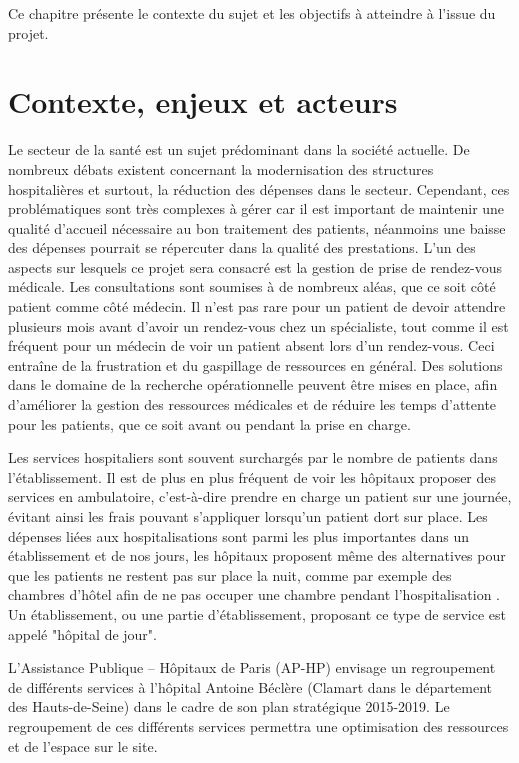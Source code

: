 \documentclass{polytech/polytech}
\begin{document}
Ce chapitre présente le contexte du sujet et les objectifs à atteindre à l'issue du projet.

\section{Contexte, enjeux et acteurs}


Le secteur de la santé est un sujet prédominant dans la société actuelle. De nombreux débats existent concernant la modernisation des structures hospitalières et surtout, la réduction des dépenses dans le secteur. Cependant, ces problématiques sont très complexes à gérer car il est important de maintenir une qualité d'accueil nécessaire au bon traitement des patients, néanmoins une baisse des dépenses pourrait se répercuter dans la qualité des prestations. L'un des aspects sur lesquels ce projet sera consacré est la gestion de prise de rendez-vous médicale. Les consultations sont soumises à de nombreux aléas, que ce soit côté patient comme côté médecin. Il n'est pas rare pour un patient de devoir attendre plusieurs mois avant d'avoir un rendez-vous chez un spécialiste, tout comme il est fréquent pour un médecin de voir un patient absent lors d'un rendez-vous. Ceci entraîne de la frustration et du gaspillage de ressources en général. Des solutions dans le domaine de la recherche opérationnelle peuvent être mises en place, afin d'améliorer la gestion des ressources médicales et de réduire les temps d'attente pour les patients, que ce soit avant ou pendant la prise en charge. 

Les services hospitaliers sont souvent surchargés par le nombre de patients dans l'établissement. Il est de plus en plus fréquent de voir les hôpitaux proposer des services en ambulatoire, c'est-à-dire prendre en charge un patient sur une journée, évitant ainsi les frais pouvant s'appliquer lorsqu'un patient dort sur place. Les dépenses liées aux hospitalisations sont parmi les plus importantes dans un établissement et de nos jours, les hôpitaux proposent même des alternatives pour que les patients ne restent pas sur place la nuit, comme par exemple des chambres d'hôtel afin de ne pas occuper une chambre pendant l'hospitalisation \cite{noauthor_chu_nodate}. Un établissement, ou une partie d'établissement, proposant ce type de service est appelé "hôpital de jour".




L'Assistance Publique – Hôpitaux de Paris (AP-HP) envisage un regroupement de différents services à l'hôpital Antoine Béclère (Clamart dans le département des Hauts-de-Seine) dans le cadre de son plan stratégique 2015-2019. Le regroupement de ces différents services permettra une optimisation des ressources et de l'espace sur le site.
\end{document}
